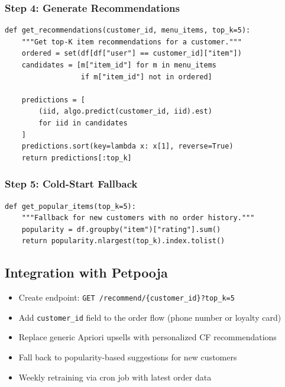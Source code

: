 \documentclass[12pt, a4paper]{article}
\begin{document}
\subsubsection{Step 4: Generate Recommendations}
\begin{lstlisting}
def get_recommendations(customer_id, menu_items, top_k=5):
    """Get top-K item recommendations for a customer."""
    ordered = set(df[df["user"] == customer_id]["item"])
    candidates = [m["item_id"] for m in menu_items
                  if m["item_id"] not in ordered]
    
    predictions = [
        (iid, algo.predict(customer_id, iid).est)
        for iid in candidates
    ]
    predictions.sort(key=lambda x: x[1], reverse=True)
    return predictions[:top_k]
\end{lstlisting}

\subsubsection{Step 5: Cold-Start Fallback}
\begin{lstlisting}
def get_popular_items(top_k=5):
    """Fallback for new customers with no order history."""
    popularity = df.groupby("item")["rating"].sum()
    return popularity.nlargest(top_k).index.tolist()
\end{lstlisting}


\subsection{Integration with Petpooja}
\begin{itemize}[nosep]
    \item Create endpoint: \texttt{GET /recommend/\{customer\_id\}?top\_k=5}
    \item Add \texttt{customer\_id} field to the order flow (phone number or loyalty card)
    \item Replace generic Apriori upsells with personalized CF recommendations
    \item Fall back to popularity-based suggestions for new customers
    \item Weekly retraining via cron job with latest order data
\end{itemize}
\end{document}
